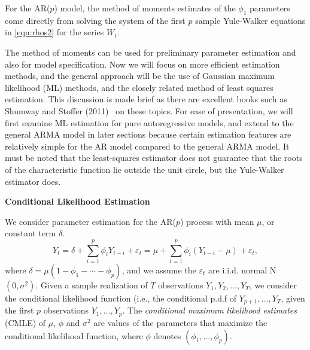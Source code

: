 \begin{ex}[AR($p$) Model]
 For the AR($p$) model, the method of moments estimates of the $\phi_1$ parameters come directly from solving the system of the first $p$ sample Yule-Walker equations in \eqref{eqn:rhos2} for the series $W_t$. \xqed
\end{ex}


The method of moments can be used for preliminary parameter estimation and also for model specification. Now we will focus on more efficient estimation methods, and the general approach will be the use of Gaussian maximum likelihood (ML) methods, and the closely related method of least squares estimation. This discussion is made brief as there are excellent books such as Shumway and Stoffer (2011)~\cite{shumway2011arima} on these topics. For ease of presentation, we will first examine ML estimation for pure autoregressive models, and extend to the general ARMA model in later sections because certain estimation features are relatively simple for the AR model compared to the general ARMA model. It must be noted that the least-squares estimator does not guarantee that the roots of the characteristic function lie outside the unit circle, but the Yule-Walker estimator does. \twomedskip


\noindent\textbf{Conditional Likelihood Estimation} \twomedskip


We consider parameter estimation for the AR($p$) process with mean $\mu$, or constant term $\delta$.
	\begin{equation} \label{eqn:ytseqagain}
	Y_t = \delta + \sum_{i=1}^p \phi_i Y_{t-i} + \varepsilon_t= \mu + \sum_{i=1}^p \phi_i (Y_{t-i} - \mu) + \varepsilon_t,
	\end{equation}
where $\delta = \mu(1 - \phi_1 - \cdots - \phi_p)$, and we assume the $\varepsilon_t$ are i.i.d. normal N$(0, \sigma^2)$. Given a sample realization of $T$ observations $Y_1, Y_2, \ldots, Y_T$, we consider the conditional likelihood function (i.e., the conditional p.d.f of $Y_{p+1}, \ldots, Y_T$, given the first $p$ observations $Y_1, \ldots, Y_p$. The \emph{conditional maximum likelihood estimates} (CMLE) of $\mu$, $\phi$ and $\sigma^2$ are values of the parameters that maximize the conditional likelihood function, where $\phi$ denotes $(\phi_1,\ldots,\phi_p)$.


